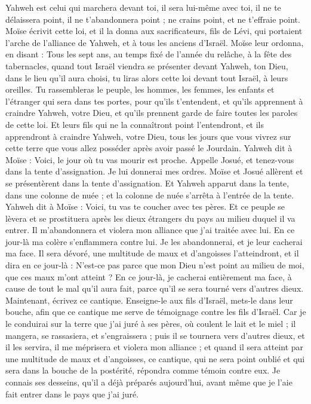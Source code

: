 \begin{multicols}{2}
Yahweh est celui qui marchera devant toi, il sera lui-même avec toi, il ne te délaissera point, il ne t'abandonnera point ; ne crains point, et ne t’effraie point.
Moïse écrivit cette loi, et il la donna aux sacrificateurs, fils de Lévi, qui portaient l'arche de l'alliance de Yahweh, et à tous les anciens d'Israël.
Moïse leur ordonna, en disant : Tous les sept ans, au temps fixé de l'année du relâche, à la fête des tabernacles,
quand tout Israël viendra se présenter devant Yahweh, ton Dieu, dans le lieu qu'il aura choisi, tu liras alors cette loi devant tout Israël, à leurs oreilles.
Tu rassembleras le peuple, les hommes, les femmes, les enfants et l’étranger qui sera dans tes portes, pour qu'ils t’entendent, et qu'ils apprennent à craindre Yahweh, votre Dieu, et qu'ils prennent garde de faire toutes les paroles de cette loi.
Et leurs fils qui ne la connaîtront point l'entendront, et ils apprendront à craindre Yahweh, votre Dieu, tous les jours que vous vivrez sur cette terre que vous allez posséder après avoir passé le Jourdain.
Yahweh dit à Moïse : Voici, le jour où tu vas mourir est proche. Appelle Josué, et tenez-vous dans la tente d’assignation. Je lui donnerai mes ordres. Moïse et Josué allèrent et se présentèrent dans la tente d’assignation.
Et Yahweh apparut dans la tente, dans une colonne de nuée ; et la colonne de nuée s'arrêta à l'entrée de la tente.
Yahweh dit à Moïse : Voici, tu vas te coucher avec tes pères. Et ce peuple se lèvera et se prostituera après les dieux étrangers du pays au milieu duquel il va entrer. Il m'abandonnera et violera mon alliance que j'ai traitée avec lui.
En ce jour-là ma colère s'enflammera contre lui. Je les abandonnerai, et je leur cacherai ma face. Il sera dévoré, une multitude de maux et d’angoisses l’atteindront, et il dira en ce jour-là : N'est-ce pas parce que mon Dieu n'est point au milieu de moi, que ces maux m'ont atteint ?
En ce jour-là, je cacherai entièrement ma face, à cause de tout le mal qu'il aura fait, parce qu'il se sera tourné vers d'autres dieux.
Maintenant, écrivez ce cantique. Enseigne-le aux fils d'Israël, mets-le dans leur bouche, afin que ce cantique me serve de témoignage contre les fils d'Israël.
Car je le conduirai sur la terre que j'ai juré à ses pères, où coulent le lait et le miel ; il mangera, se rassasiera, et s’engraissera ; puis il se tournera vers d'autres dieux, et il les servira, il me méprisera et violera mon alliance ;
et quand il sera atteint par une multitude de maux et d’angoisses, ce cantique, qui ne sera point oublié et qui sera dans la bouche de la postérité, répondra comme témoin contre eux. Je connais ses desseins, qu'il a déjà préparés aujourd'hui, avant même que je l’aie fait entrer dans le pays que j'ai juré.

\end{multicols}
